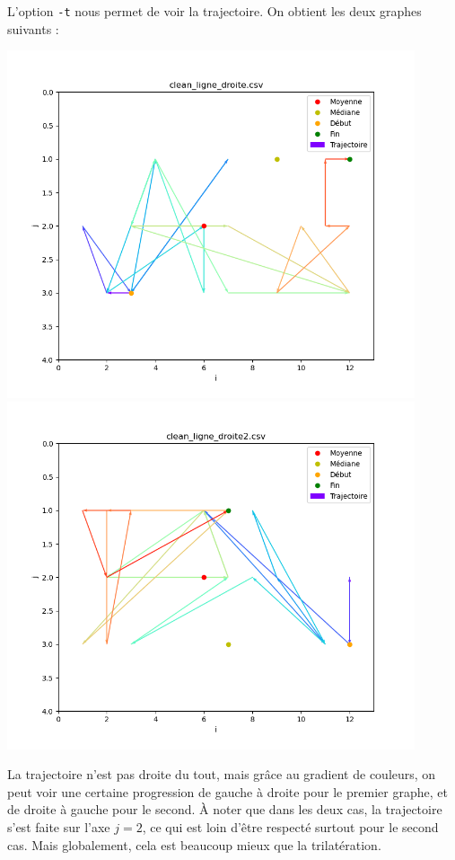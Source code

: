 \documentclass[french, a4paper, 12pt, parskip]{scrartcl}
\begin{document}
L'option \verb+-t+ nous permet de voir la trajectoire. On obtient les deux
graphes suivants :
\begin{center}
  \includegraphics[width=0.9\textwidth]{finger1-l1.png}
  \includegraphics[width=0.9\textwidth]{finger1-l2.png}
\end{center}
La trajectoire n'est pas droite du tout, mais grâce au gradient de couleurs, on
peut voir une certaine progression de gauche à droite pour le premier graphe,
et de droite à gauche pour le second. À noter que dans les deux cas, la
trajectoire s'est faite sur l'axe $j=2$, ce qui est loin d'être respecté
surtout pour le second cas. Mais globalement, cela est beaucoup mieux que la
trilatération.
\end{document}
